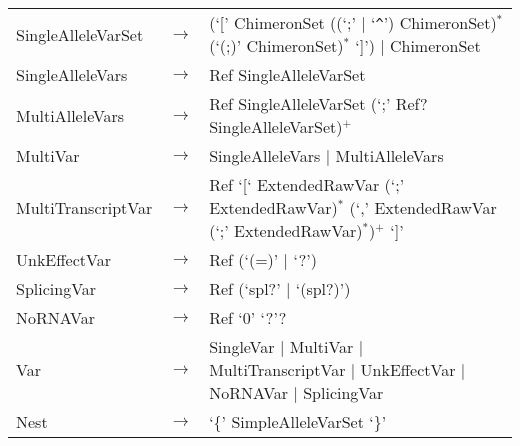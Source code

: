 \begin{longtable}{llp{7cm}}
SingleAlleleVarSet & $\rightarrow$ & (`[' ChimeronSet ((`;' $|$ `\verb#^#') ChimeronSet)$^*$ (`(;)' ChimeronSet)$^*$ `]') $|$ ChimeronSet\\
SingleAlleleVars & $\rightarrow$ & Ref SingleAlleleVarSet\\
MultiAlleleVars & $\rightarrow$ & Ref SingleAlleleVarSet (`;' Ref? SingleAlleleVarSet)$^+$\\
MultiVar & $\rightarrow$ & SingleAlleleVars $|$ MultiAlleleVars\\
MultiTranscriptVar & $\rightarrow$ & Ref `[` ExtendedRawVar (`;' ExtendedRawVar)$^*$ (`,' ExtendedRawVar (`;' ExtendedRawVar)$^*$)$^+$ `]'\\
UnkEffectVar & $\rightarrow$ & Ref (`(=)' $|$ `?')\\
SplicingVar & $\rightarrow$ & Ref (`spl?' $|$ `(spl?)')\\
NoRNAVar & $\rightarrow$ & Ref `0' `?'?\\
Var & $\rightarrow$ & SingleVar $|$ MultiVar $|$ MultiTranscriptVar $|$ UnkEffectVar $|$ NoRNAVar $|$ SplicingVar\\
Nest & $\rightarrow$ & `\{' SimpleAlleleVarSet `\}'
\end{longtable}
